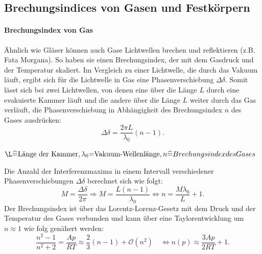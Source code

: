\FloatBarrier
\subsection{Brechungsindices von Gasen und Festkörpern}
\paragraph{Brechungsindex von Gas}
Ähnlich wie Gläser können auch Gase Lichtwellen brechen und reflektieren (z.B. Fata Morgana).
So haben sie einen Brechungsindex, der mit dem Gasdruck und der Temperatur skaliert.
Im Vergleich zu einer Lichtwelle, die durch das Vakuum läuft, ergibt sich für die Lichtwelle in Gas eine Phasenverschiebung $\Delta \delta$.
Somit lässt sich bei zwei Lichtwellen, von denen eine über die Länge $L$ durch eine evakuierte Kammer läuft und die andere über die Länge $L$ weiter durch das Gas verläuft, die Phasenverschiebung in Abhängigkeit des Brechungsindex $n$ des Gases ausdrücken:
\begin{equation}
	\Delta \delta = \frac{2 \pi L}{\lambda_{0}} (n-1) .
\end{equation}
\begin{center}
	\tiny{$\L \widehat{=} \text{Länge der Kammer}, \lambda_{0}{=} \text{Vakuum-Wellenlänge}, n \widehat{=} Brechungsindex des Gases$}
\end{center}
Die Anzahl der Interferenzmaxima in einem Intervall verschiedener Phasenverschiebungen $\Delta \delta$ berechnet sich wie folgt:
\begin{equation*}
	M = \frac{\Delta \delta}{2 \pi} \Rightarrow M = \frac{L (n-1)}{\lambda_{0}} \Leftrightarrow n = \frac{M \lambda_{0}}{L} +1.
\end{equation*}
Der Brechungsindex ist über das Lorentz-Lorenz-Gesetz mit dem Druck und der Temperatur des Gases verbunden und kann über eine Taylorentwicklung um $n\approx 1$ wie folg genähert werden:
\begin{equation}
	\frac{n^2-1}{n^2+2} = \frac{A p }{R T} \approx  \frac{2}{3} (n-1) + \mathcal{O}(n^2) \quad \Leftrightarrow n(p) \approx \frac{3A p}{2R T} +1.
	\label{eqn:gas}
\end{equation}

